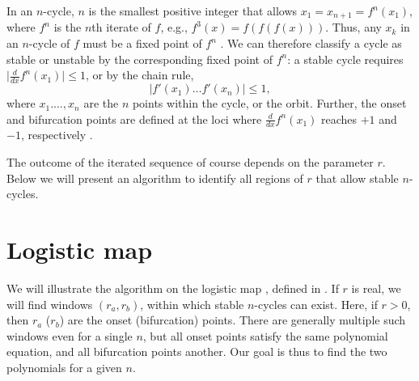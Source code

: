 \documentclass[preprint]{revtex4-1}
\begin{document}
In an $n$-cycle, $n$ is the smallest positive integer
  that allows $x_1 = x_{n+1} = f^n(x_1)$,
  where $f^n$ is the $n$th iterate of $f$,
  e.g., $f^3(x) = f(f(f(x)))$.
Thus, any $x_k$ in an $n$-cycle of $f$ must be a fixed point of $f^n$
%
\big[the reverse is, however, untrue, for a fixed point of $f^n$
  can also be a fixed point of $f^d$ as long as $d|n$:
  if $f^d(x) = x$, then $f^n(x) = f^d(\cdots f^d(x)\cdots) = x$\big].
%
%
We can therefore classify a cycle as stable or unstable
  by the corresponding fixed point of $f^n$:
  a stable cycle requires
  $\big| \frac {d} {dx} f^n(x_1) \big| \le 1$,
  or by the chain rule,
%
%
%
\begin{equation}
  \Big| f'(x_1) \dots f'(x_n) \Big| \le 1,
\label{eq:der}
\end{equation}
where $x_1. \ldots, x_n$ are the $n$ points within the cycle, or the orbit.
Further, the onset and bifurcation points
  are defined at the loci
  where $\frac {d} {dx} f^n(x_1)$ reaches $+1$ and $-1$,
  respectively \cite{strogatz}.
%
%
%



The outcome of the iterated sequence of course
  depends on the parameter $r$.
%
Below we will present an algorithm to identify
  all regions of $r$ that allow stable $n$-cycles.
%








\section{\label{sec:logmap}Logistic map}


We will illustrate the algorithm on the logistic map \cite{may, strogatz},
  defined in .
If $r$ is real,
  we will find windows $(r_a, r_b)$,
    within which stable $n$-cycles can exist.
%
Here, if $r > 0$, then
  $r_a$ ($r_b$) are the onset (bifurcation) points.
%
There are generally multiple such windows even for a single $n$,
but all onset points satisfy the same polynomial equation,
  and all bifurcation points another.
%
Our goal is thus to find the two polynomials for a given $n$.
\end{document}
